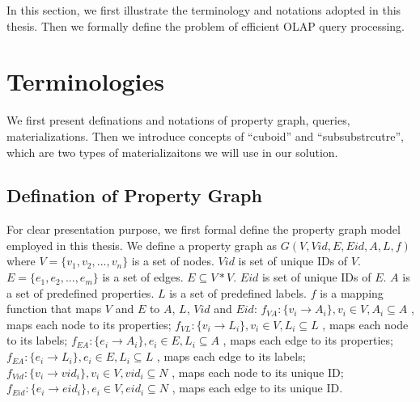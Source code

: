 In this section, we first illustrate the terminology and notations adopted in this thesis. Then we formally define the problem of efficient OLAP query processing. 

\section{Terminologies}

We first present definations and notations of property graph, queries, materializations. Then we introduce concepts of ``cuboid'' and ``subsubstrcutre'', which are two types of materializaitons we will use in our solution. 

\subsection{Defination of Property Graph}
For clear presentation purpose, we first formal define the property graph model employed in this thesis. We define a property graph as $G(V, Vid, E, Eid, A, L, f)$ where  $V=\{v_{1}, v_{2},...,v_{n}\}$ is a set of nodes. $Vid$ is set of unique IDs of $V$. $E=\{e_{1}, e_{2},...,e_{m}\}$ is a set of edges. $E \subseteq V * V$. $Eid$ is set of unique IDs of $E$. $A$ is a set of predefined properties. $L$ is a set of predefined labels. $f$ is a mapping function that maps $V$ and $E$ to $A$, $L$, $Vid$ and $Eid$: $f_{VA}: \{v_{i} \rightarrow A_{i}\}, v_{i}\in V, A_{i} \subseteq A$ , maps each node to its properties; $f_{VL}: \{v_{i} \rightarrow L_{i}\}, v_{i}\in V, L_{i} \subseteq L$ , maps each node to its labels; $f_{EA}: \{e_{i} \rightarrow A_{i}\}, e_{i}\in E, L_{i} \subseteq A$ , maps each edge to its properties; $f_{EA}: \{e_{i} \rightarrow L_{i}\}, e_{i}\in E, L_{i} \subseteq L$ , maps each edge to its labels; $f_{Vid}: \{v_{i} \rightarrow vid_{i}\}, v_{i}\in V, vid_{i} \subseteq N$ , maps each node to its unique ID; $f_{Eid}: \{e_{i} \rightarrow eid_{i}\}, e_{i}\in V, eid_{i} \subseteq N$ , maps each edge to its unique ID.

